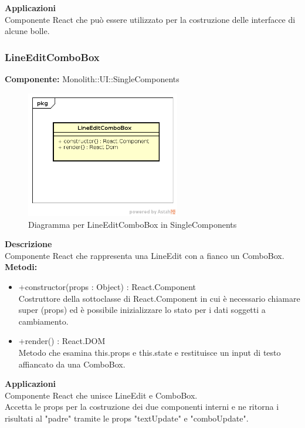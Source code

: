 \textbf{Applicazioni}\\
Componente React che può essere utilizzato per la costruzione delle interfacce di alcune bolle. 


\clearpage

\subsubsection{LineEditComboBox}
\textbf{Componente:}  Monolith::UI::SingleComponents\\
   \FloatBarrier
   \begin{figure}[ht]
   \centering
   \includegraphics[width=0.6\textwidth]{img/single-LineEditComboBox}
   \caption{{Diagramma per LineEditComboBox in SingleComponents}}
\end{figure}
\FloatBarrier
\textbf{Descrizione}\\
Componente React che rappresenta una LineEdit con a fianco un ComboBox. \\
\textbf{Metodi:} 
\begin{itemize}

\item +constructor(props : Object) : React.Component 
\\
Costruttore della sottoclasse di React.Component in cui è necessario chiamare super (props) ed è possibile inizializzare lo stato per i dati soggetti a cambiamento.

\item +render() : React.DOM 
\\
Metodo che esamina this.props e this.state e restituisce un input di testo affiancato da una ComboBox.

\end{itemize} 


\textbf{Applicazioni}\\
Componente React che unisce LineEdit e ComboBox.\\
Accetta le props per la costruzione dei due componenti interni e ne ritorna i risultati al "padre" tramite le props "textUpdate" e "comboUpdate". 


